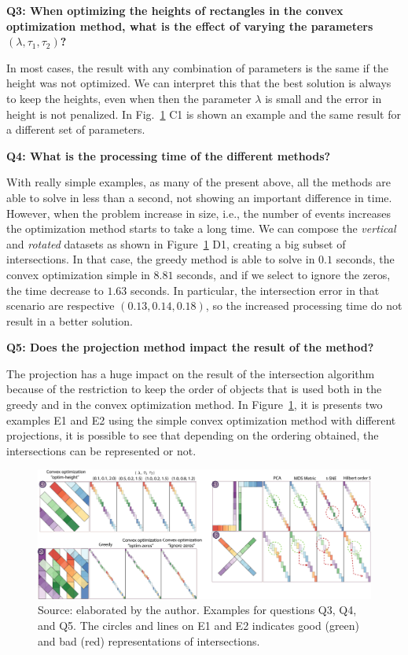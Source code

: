 \textbf{Q3: When optimizing the heights of rectangles in the convex optimization method, what is the effect of varying the parameters $(\lambda, \tau_1, \tau_2)$?}

In most cases, the result with any combination of parameters is the same if the height was not optimized.
%
We can interpret this that the best solution is always to keep the heights, even when then the parameter $\lambda$ is small and the error in height is not penalized.
%
In Fig.~\ref{fig:vert-pos-alg2} C1 is shown an example and the same result for a different set of parameters.

\textbf{Q4: What is the processing time of the different methods?}

With really simple examples, as many of the present above, all the methods are able to solve in less than a second, not showing an important difference in time.
%
However, when the problem increase in size, i.e., the number of events increases the optimization method starts to take a long time.
%
We can compose the \textit{vertical} and \textit{rotated} datasets as shown in Figure~\ref{fig:vert-pos-alg2} D1, creating a big subset of intersections.
In that case, the greedy method is able to solve in $0.1$ seconds, the convex optimization simple in $8.81$ seconds, and if we select to ignore the zeros, the time decrease to $1.63$ seconds. In particular, the intersection error in that scenario are respective $(0.13, 0.14, 0.18)$, so the increased processing time do not result in a better solution.

\textbf{Q5: Does the projection method impact the result of the method?}

The projection has a huge impact on the result of the intersection algorithm because of the restriction to keep the order of objects that is used both in the greedy and in the convex optimization method.
%
In Figure~\ref{fig:vert-pos-alg2}, it is presents two examples E1 and E2 using the simple convex optimization method with different projections, it is possible to see that depending on the ordering obtained, the intersections can be represented or not.

\begin{figure}
    \centering
    \includegraphics[width = \linewidth]{src/imgs/vert-pos-alg2.pdf}
    \caption{Source: elaborated by the author. Examples for questions Q3, Q4, and Q5. The circles and lines on E1 and E2 indicates good (green) and bad (red) representations of intersections.}
    \label{fig:vert-pos-alg2}
\end{figure}


